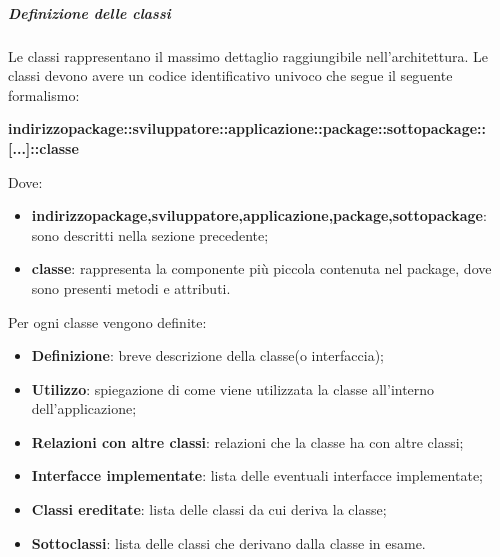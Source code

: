 			\subparagraph{Definizione delle classi}
			Le classi rappresentano il massimo dettaglio raggiungibile nell'architettura. Le classi devono avere un codice identificativo univoco che segue il seguente formalismo:\newline
			\centerline{\textbf{indirizzo\textunderscore package::sviluppatore::applicazione::package::sottopackage::[...]::classe}}\newline
			Dove:
			\begin{itemize}
			\item \textbf{indirizzo\textunderscore package,sviluppatore,applicazione,package,sottopackage}: sono descritti nella sezione precedente;
			\item \textbf{classe}: rappresenta la componente più piccola contenuta nel package, dove sono presenti metodi e attributi.
			\end{itemize}
			Per ogni classe vengono definite:
			\begin{itemize}
			\item \textbf{Definizione}: breve descrizione della classe(o interfaccia);
			\item \textbf{Utilizzo}: spiegazione di come viene utilizzata la classe all'interno dell'applicazione;
			\item \textbf{Relazioni con altre classi}: relazioni che la classe ha con altre classi;
			\item \textbf{Interfacce implementate}: lista delle eventuali interfacce implementate;
			\item \textbf{Classi ereditate}: lista delle classi da cui deriva la classe;
			\item \textbf{Sottoclassi}: lista delle classi che derivano dalla classe in esame.
			\end{itemize}
